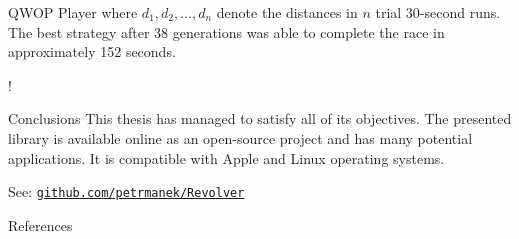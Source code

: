 \documentclass[a0paper,portrait]{baposter}
\begin{document}
\begin{poster}
\begin{posterbox}[name=qwop,column=2]{QWOP Player}
	where $d_1,d_2,\dots,d_n$ denote the distances in $n$ trial 30-second runs. The best strategy after 38 generations was able to complete the race in approximately 152 seconds.

	\vspace{-1.4em}

	\begin{center}
		\resizebox {\columnwidth} {!} {
		}
	\end{center}
\end{posterbox}

\begin{posterbox}[name=conclusion,column=2,below=qwop]{Conclusions}
	This thesis has managed to satisfy all of its objectives. The presented library is available online as an open-source project and has many potential applications. It is compatible with Apple and Linux operating systems.

	\vspace{1em}

	\hfill See: \href{https://github.com/petrmanek/Revolver}{\texttt{github.com/petrmanek/Revolver}}
\end{posterbox}

\begin{posterbox}[name=ref,column=2,below=conclusion,bottomaligned=car]{References}
	\smaller
     
     
     \renewcommand{\section}[2]{\vskip 0.05em}
     
\end{posterbox}

\end{poster}
\end{document}
